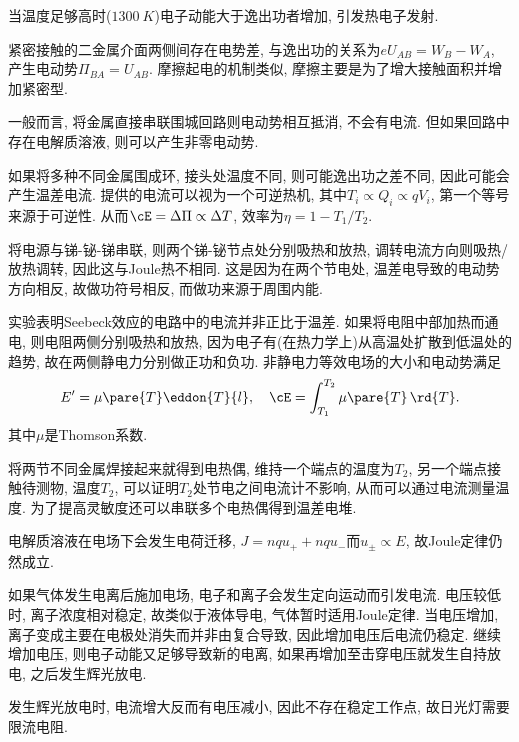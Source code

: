 \documentclass[../Electromagnetism.tex]{subfiles}
\begin{document}
\begin{ex}
	当温度足够高时($\SI{1300}{K}$)电子动能大于逸出功者增加, 引发热电子发射.
\end{ex}
\begin{ex}
	紧密接触的二金属介面两侧间存在电势差, 与逸出功的关系为$eU_{AB} = W_B - W_A$, 产生电动势$\Pi_{BA} = U_{AB}$. 摩擦起电的机制类似, 摩擦主要是为了增大接触面积并增加紧密型.
\end{ex}
\begin{ex}
	一般而言, 将金属直接串联围城回路则电动势相互抵消, 不会有电流. 但如果回路中存在电解质溶液, 则可以产生非零电动势.
\end{ex}
\begin{ex}[Seebeck效应]
	如果将多种不同金属围成环, 接头处温度不同, 则可能逸出功之差不同, 因此可能会产生温差电流. 提供的电流可以视为一个可逆热机, 其中$T_i \propto Q_i \propto qV_i$, 第一个等号来源于可逆性. 从而$\cE = \Delta \Pi \propto \Delta T$, 效率为$\eta = 1 - T_1/T_2$.
\end{ex}
\begin{ex}[Peltier效应]
	将电源与锑-铋-锑串联, 则两个锑-铋节点处分别吸热和放热, 调转电流方向则吸热/放热调转, 因此这与Joule热不相同. 这是因为在两个节电处, 温差电导致的电动势方向相反, 故做功符号相反, 而做功来源于周围内能.
\end{ex}
\begin{ex}[Thomson效应]
	实验表明Seebeck效应的电路中的电流并非正比于温差. 如果将电阻中部加热而通电, 则电阻两侧分别吸热和放热, 因为电子有(在热力学上)从高温处扩散到低温处的趋势, 故在两侧静电力分别做正功和负功. 非静电力等效电场的大小和电动势满足
	\[ E' = \mu\pare{T} \eddon{T}{l},\quad \cE = \int_{T_1}^{T_2}\mu\pare{T}\,\rd{T}. \]
	其中$\mu$是Thomson系数.
\end{ex}
\begin{ex}
	将两节不同金属焊接起来就得到电热偶, 维持一个端点的温度为$T_2$, 另一个端点接触待测物, 温度$T_2$, 可以证明$T_2$处节电之间电流计不影响, 从而可以通过电流测量温度. 为了提高灵敏度还可以串联多个电热偶得到温差电堆.
\end{ex}
\begin{ex}[液体导电]
	电解质溶液在电场下会发生电荷迁移, $J = nqu_+ + nqu_-$而$u_{\pm}\propto E$, 故Joule定律仍然成立.
\end{ex}
\begin{ex}[气体导电]
	如果气体发生电离后施加电场, 电子和离子会发生定向运动而引发电流. 电压较低时, 离子浓度相对稳定, 故类似于液体导电, 气体暂时适用Joule定律. 当电压增加, 离子变成主要在电极处消失而并非由复合导致, 因此增加电压后电流仍稳定. 继续增加电压, 则电子动能又足够导致新的电离, 如果再增加至击穿电压就发生自持放电, 之后发生辉光放电.
\end{ex}
\begin{ex}
	发生辉光放电时, 电流增大反而有电压减小, 因此不存在稳定工作点, 故日光灯需要限流电阻.
\end{ex}



\end{document}
